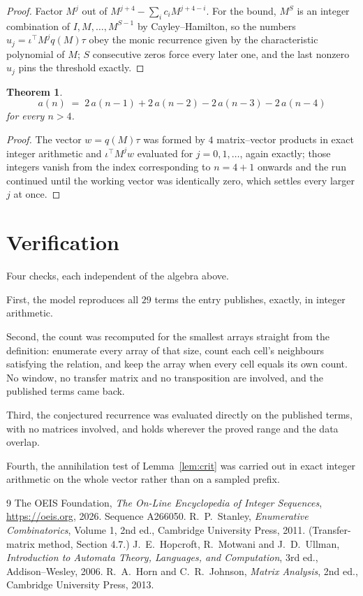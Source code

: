 \documentclass[11pt,a4paper]{article}
\theoremstyle{plain}
\newtheorem{theorem}{Theorem}
\theoremstyle{definition}
\begin{document}
\begin{proof}
Factor $M^{j}$ out of $M^{j+4}-\sum_ic_iM^{j+4-i}$. For the bound, $M^{S}$
is an integer combination of $I,M,\dots,M^{S-1}$ by Cayley--Hamilton, so the numbers
$u_j=\iota^{\!\top}M^{j}q(M)\tau$ obey the monic recurrence given by the characteristic
polynomial of $M$; $S$ consecutive zeros force every later one, and the last nonzero $u_j$
pins the threshold exactly.
\end{proof}

\begin{theorem}
\[
a(n)\;=\;2\,a(n-1) + 2\,a(n-2) - 2\,a(n-3) - 2\,a(n-4)
\]
for every $n>4$.
\end{theorem}

\begin{proof}
The vector $w=q(M)\tau$ was formed by $4$ matrix--vector products in exact integer
arithmetic and $\iota^{\!\top}M^{j}w$ evaluated for $j=0,1,\dots$, again exactly; those
integers vanish from the index corresponding to $n=4+1$ onwards and the run continued
until the working vector was identically zero, which settles every larger $j$ at once.
\end{proof}

\section{Verification}

Four checks, each independent of the algebra above.

First, the model reproduces all $29$ terms the entry publishes, exactly, in integer
arithmetic.

Second, the count was recomputed for the smallest arrays straight from the definition:
enumerate every array of that size, count each cell's neighbours satisfying the relation, and
keep the array when every cell equals its own count. No window, no transfer matrix and no
transposition are involved, and the published terms came back.

Third, the conjectured recurrence was evaluated directly on the published terms, with no
matrices involved, and holds wherever the proved range and the data overlap.

Fourth, the annihilation test of Lemma~\ref{lem:crit} was carried out in exact integer
arithmetic on the whole vector rather than on a sampled prefix.

\begin{thebibliography}{9}
 The OEIS Foundation, \emph{The On-Line Encyclopedia of Integer
Sequences}, \url{https://oeis.org}, 2026. Sequence A266050.
 R.~P.~Stanley, \emph{Enumerative Combinatorics}, Volume 1, 2nd ed.,
Cambridge University Press, 2011. (Transfer-matrix method, Section 4.7.)
 J.~E.~Hopcroft, R.~Motwani and J.~D.~Ullman, \emph{Introduction to Automata
Theory, Languages, and Computation}, 3rd ed., Addison--Wesley, 2006.
 R.~A.~Horn and C.~R.~Johnson, \emph{Matrix Analysis}, 2nd ed., Cambridge
University Press, 2013.
\end{thebibliography}
\end{document}
